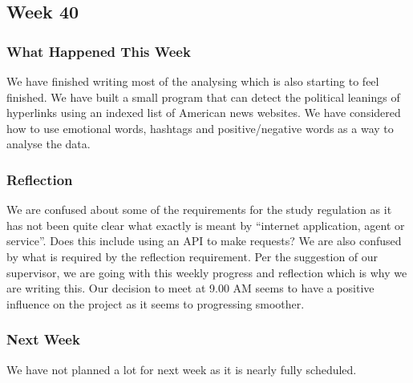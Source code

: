 \subsection{Week 40}
\subsubsection{What Happened This Week}
We have finished writing most of the analysing which is also starting to feel
finished. We have built a small program that can detect the political leanings
of hyperlinks using an indexed list of American news websites. We have
considered how to use emotional words, hashtags and positive/negative words
as a way to analyse the data.

\subsubsection{Reflection}
We are confused about some of the requirements for the study
regulation as it has not been quite clear what exactly is meant by ``internet
application, agent or service''. Does this include using an API to make
requests? We are also confused by what is required by the reflection
requirement. Per the suggestion of our supervisor, we are going with this
weekly progress and reflection which is why we are writing this. Our decision
to meet at 9.00 AM seems to have a positive influence on the project as it
seems to progressing smoother.

\subsubsection{Next Week} 
We have not planned a lot for next week as it is nearly fully scheduled.



% 

